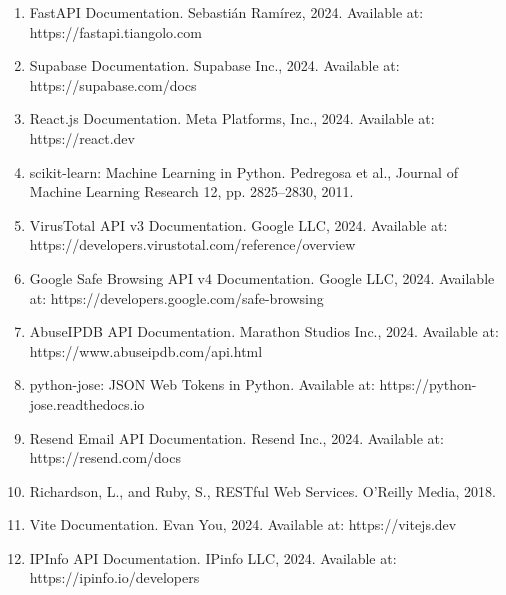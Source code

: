 \documentclass[12pt,a4paper,final,oneside]{report}
\begin{document}
\begin{enumerate}

\item FastAPI Documentation. Sebastián Ramírez, 2024. Available at: https://fastapi.tiangolo.com

\item Supabase Documentation. Supabase Inc., 2024. Available at: https://supabase.com/docs

\item React.js Documentation. Meta Platforms, Inc., 2024. Available at: https://react.dev

\item scikit-learn: Machine Learning in Python. Pedregosa et al., Journal of Machine Learning Research 12, pp. 2825--2830, 2011.

\item VirusTotal API v3 Documentation. Google LLC, 2024. Available at: https://developers.virustotal.com/reference/overview

\item Google Safe Browsing API v4 Documentation. Google LLC, 2024. Available at: https://developers.google.com/safe-browsing

\item AbuseIPDB API Documentation. Marathon Studios Inc., 2024. Available at: https://www.abuseipdb.com/api.html

\item python-jose: JSON Web Tokens in Python. Available at: https://python-jose.readthedocs.io

\item Resend Email API Documentation. Resend Inc., 2024. Available at: https://resend.com/docs

\item Richardson, L., and Ruby, S., RESTful Web Services. O'Reilly Media, 2018.

\item Vite Documentation. Evan You, 2024. Available at: https://vitejs.dev

\item IPInfo API Documentation. IPinfo LLC, 2024. Available at: https://ipinfo.io/developers

\end{enumerate}
\end{document}
